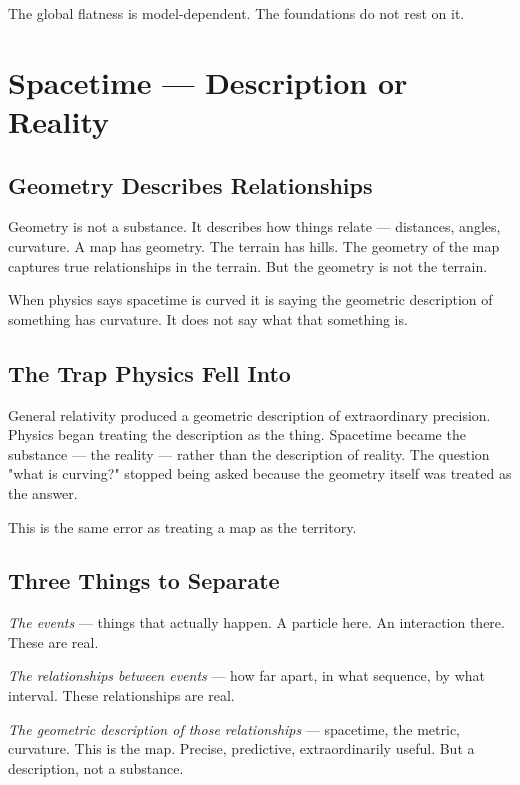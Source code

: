 \documentclass[11pt]{article}
\begin{document}
The global flatness is model-dependent. The foundations do not rest on it.

\section{Spacetime — Description or Reality}
\label{sec:org7c7d7a1}

\subsection{Geometry Describes Relationships}
\label{sec:org0721c44}

Geometry is not a substance. It describes how things relate — distances, angles,
curvature. A map has geometry. The terrain has hills. The geometry of the map
captures true relationships in the terrain. But the geometry is not the terrain.

When physics says spacetime is curved it is saying the geometric description of
something has curvature. It does not say what that something is.

\subsection{The Trap Physics Fell Into}
\label{sec:org23ee2f7}

General relativity produced a geometric description of extraordinary precision.
Physics began treating the description as the thing. Spacetime became the
substance — the reality — rather than the description of reality. The question
"what is curving?" stopped being asked because the geometry itself was treated as
the answer.

This is the same error as treating a map as the territory.

\subsection{Three Things to Separate}
\label{sec:org191ed14}

\emph{The events} — things that actually happen. A particle here. An interaction
there. These are real.

\emph{The relationships between events} — how far apart, in what sequence, by what
interval. These relationships are real.

\emph{The geometric description of those relationships} — spacetime, the metric,
curvature. This is the map. Precise, predictive, extraordinarily useful. But a
description, not a substance.
\end{document}
